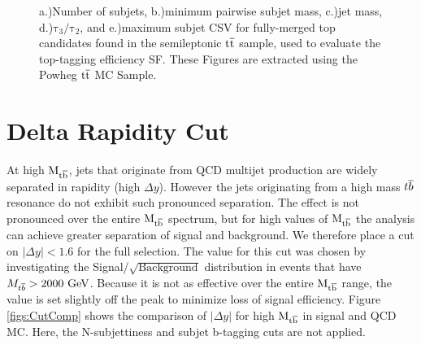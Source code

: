 \begin{figure}
\begin{center}
\end{center}
\caption{ a.)Number of subjets, b.)minimum pairwise subjet mass, c.)jet mass, d.)$\mathrm{\tau_{3}/\tau_{2}}$, and  e.)maximum subjet CSV for fully-merged top candidates
  found in the semileptonic $\mathrm{t\overline{t}}$ sample, used to evaluate the top-tagging efficiency SF.  These Figures are extracted using the Powheg $\mathrm{t\overline{t}}$ MC Sample. }%
\label{figs:type1_topmasspowheg}
\end{figure}

\section{Delta Rapidity Cut}
\label{sec:deltarapidity}
At high $\mathrm{M_{{t\overline{b}}}}$, jets that originate from QCD multijet production are widely separated in rapidity (high $\Delta y$).
However the jets originating from a high mass ${t\overline{b}}$ resonance do not exhibit such pronounced separation.  The effect is not pronounced over the entire 
$\mathrm{M_{{t\overline{b}}}}$ spectrum, but for high values of $\mathrm{M_{{t\overline{b}}}}$ the analysis can achieve greater separation of signal and background.  We therefore place a cut on $|\Delta y| < 1.6$ 
for the full selection.  The value for this cut was chosen by investigating the Signal/$\sqrt{\text{Background}}$ distribution in events that have $M_{{t\overline{b}}}>2000~\mathrm{GeV}$.  
Because it is not as effective over the entire $\mathrm{M_{{t\overline{b}}}}$ range, the value is set slightly off the peak to minimize loss of signal efficiency.
Figure \ref{figs:CutComp} shows the comparison of $|\Delta y|$ for high $\mathrm{M_{{t\overline{b}}}}$ in signal and QCD MC.  
Here, the N-subjettiness and subjet b-tagging cuts are not applied.

